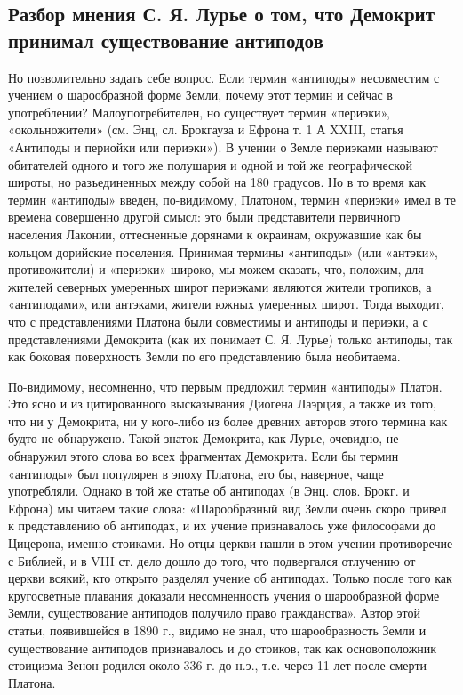 \subsection{Разбор мнения С. Я. Лурье о том, что Демокрит принимал
существование антиподов}

Но позволительно задать себе вопрос. Если термин «антиподы»
несовместим с учением о шарообразной форме Земли, почему этот термин и
сейчас в употреблении? Малоупотребителен, но существует термин
«периэки», «окольножители» (см. Энц, сл. Брокгауза и Ефрона т. 1 А
XXIII, статья «Антиподы и периойки или периэки»). В учении о Земле
периэками называют обитателей одного и того же полушария и одной и той
же географической широты, но разъединенных между собой на 180
градусов. Но в то время как термин «антиподы» введен, по-видимому,
Платоном, термин «периэки» имел в те времена совершенно другой смысл:
это были представители первичного населения Лаконии, оттесненные
дорянами к окраинам, окружавшие как бы кольцом дорийские поселения.
Принимая термины «антиподы» (или «антэки», противожители) и «периэки»
широко, мы можем сказать, что, положим, для жителей северных умеренных
широт периэками являются жители тропиков, а «антиподами», или
антэками, жители южных умеренных широт. Тогда выходит, что с
представлениями Платона были совместимы и антиподы и периэки, а с
представлениями Демокрита (как их понимает С. Я. Лурье) только
антиподы, так как боковая поверхность Земли по его представлению была
необитаема.

По-видимому, несомненно, что первым предложил термин «антиподы»
Платон. Это ясно и из цитированного высказывания Диогена Лаэрция, а
также из того, что ни у Демокрита, ни у кого-либо из более древних
авторов этого термина как будто не обнаружено. Такой знаток Демокрита,
как Лурье, очевидно, не обнаружил этого слова во всех фрагментах
Демокрита. Если бы термин «антиподы» был популярен в эпоху Платона,
его бы, наверное, чаще употребляли. Однако в той же статье об
антиподах (в Энц. слов. Брокг. и Ефрона) мы читаем такие слова:
«Шарообразный вид Земли очень скоро привел к представлению об
антиподах, и их учение признавалось уже философами до Цицерона, именно
стоиками. Но отцы церкви нашли в этом учении противоречие с Библией, и
в VIII ст. дело дошло до того, что подвергался отлучению от церкви
всякий, кто открыто разделял учение об антиподах. Только после того
как кругосветные плавания доказали несомненность учения о шарообразной
форме Земли, существование антиподов получило право гражданства».
Автор этой статьи, появившейся в 1890 г., видимо не знал, что
шарообразность Земли и существование антиподов признавалось и до
стоиков, так как основоположник стоицизма Зенон родился около 336 г.
до н.э., т.е. через 11 лет после смерти Платона.

